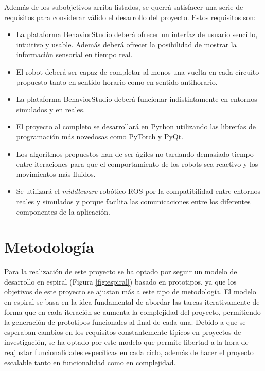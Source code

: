 \noindent Además de los subobjetivos arriba listados, se querrá satisfacer una serie de requisitos para considerar válido el desarrollo del proyecto. Estos requisitos son:

\begin{itemize}
    \item La plataforma BehaviorStudio deberá ofrecer un interfaz de usuario sencillo, intuitivo y usable. Además deberá ofrecer la posibilidad de mostrar la información sensorial en tiempo real.
    \item El robot deberá ser capaz de completar al menos una vuelta en cada circuito propuesto tanto en sentido horario como en sentido antihorario.
    \item La plataforma BehaviorStudio deberá funcionar indistintamente en entornos simulados y en reales.
    \item El proyecto al completo se desarrollará en Python utilizando las librerías de programación más novedosas como PyTorch y PyQt.
    \item Los algoritmos propuestos han de ser ágiles no tardando demasiado tiempo entre iteraciones para que el comportamiento de los robots sea reactivo y los movimientos más fluidos.
    \item Se utilizará el \textit{middleware} robótico ROS por la compatibilidad entre entornos reales y simulados y porque facilita las comunicaciones entre los diferentes componentes de la aplicación.
\end{itemize}

\section{Metodología}

Para la realización de este proyecto se ha optado por seguir un modelo de desarrollo en espiral (Figura \ref{fig:espiral}) basado en prototipos, ya que los objetivos de este proyecto se ajustan más a este tipo de metodología. El modelo en espiral se basa en la idea fundamental de abordar las tareas iterativamente de forma que en cada iteración se aumenta la complejidad del proyecto, permitiendo la generación de prototipos funcionales al final de cada una. Debido a que se esperaban cambios en los requisitos constantemente típicos en proyectos de investigación, se ha optado por este modelo que permite libertad a la hora de reajustar funcionalidades específicas en cada ciclo, además de hacer el proyecto escalable tanto en funcionalidad como en complejidad.

